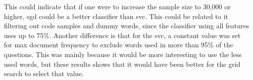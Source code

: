 


This could indicate that if one were to increase the sample size to 30,000 or higher, \gls{sgd} could be a better classifier than \gls{svc}.
This could be related to it filtering out code samples and dummy words, since the classifier using all features uses up to 75\%.
Another difference is that for the \gls{svc}, a constant value was set for max document frequency to exclude words used in more than 95\% of the questions. 
This was mainly because it would be more interesting to use the less used words, but these results shows that it would have been better for the grid search to select that value.


\begin{comment}


\end{comment}

